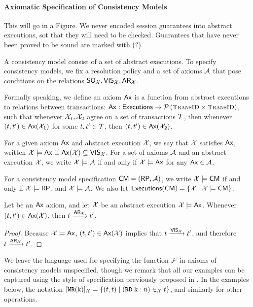 \paragraph{Axiomatic Specification of Consistency Models}
\ac{This will go in a Figure. We never encoded session guarantees into abstract 
executions, sot that they will need to be checked. Guarantees that have never been 
proved to be sound are marked with (?)}

A consistency model consist of a set of abstract executions. 
To specify consistency models, we fix a resolution policy and 
a set of axioms $\mathcal{A}$ that pose conditions on the relations ${\sf{SO}}_{\mathcal{X}}, {\mathsf{VIS}}_{\mathcal{X}}, {\sf{AR}}_{\mathcal{X}}$. 
\begin{definition}
Formally speaking, we define an axiom $\mathsf{Ax}$ is a function from abstract executions to relations between transactions: 
$\Ax: \aeset \rightarrow \powerset{\TxID \times \TxID}$, such that whenever 
$\mathcal{X}_1, \mathcal{X}_2$ agree on a set of transactions $\mathcal{T}$, then whenever $(t, t') \in \mathsf{Ax}(\mathcal{X}_1)$ 
for some $t, t' \in \mathcal{T}$, then $(t, t') \in \mathsf{Ax}(\mathcal{X}_2)$.

For a given axiom $\mathsf{Ax}$ and abstract execution $\mathcal{X}$, 
we say that $\mathcal{X}$ satisfies $\mathsf{Ax}$, written $\mathcal{X} \models \mathsf{Ax}$ if $\mathsf{Ax}(\mathcal{X}) \subseteq {\mathsf{VIS}}_{\mathcal{X}}$. 
For a set of axioms $\mathcal{A}$ and an abstract execution $\mathcal{X}$, we write $\mathcal{X} \models \mathcal{A}$ if 
and only if $\mathcal{X} \models \mathsf{Ax}$ for any $\mathsf{Ax} \in \mathcal{A}$. 
\end{definition}

For a consistency model specification 
$\mathsf{CM} = (\mathsf{RP}, \mathcal{A})$, we write $\mathcal{X} \models \mathsf{CM}$ if and only if $\mathcal{X} \models \mathsf{RP}$, 
and $\mathcal{X} \models \mathcal{A}$. We also let ${\mathsf{Executions}}(\mathsf{CM}) = \{ \mathcal{X} \mid \mathcal{X} \models \mathsf{CM} \}$.

\begin{proposition}
\label{prop:ax2ar}
Let be an $\mathsf{Ax}$ axiom, and let $\mathcal{X}$ be an abstract execution $\mathcal{X} \models \mathsf{Ax}$. 
Whenever $(t, t') \in \mathsf{Ax}(\mathcal{X})$, then $t \xrightarrow{{\sf{AR}}_{\mathcal{X}}} t'$.
\end{proposition}

\begin{proof}
Because $\mathcal{X} \models \mathsf{Ax}$, $(t, t') \in \mathsf{Ax}(\mathcal{X})$ implies that 
$t \xrightarrow{{\mathsf{VIS}}_{\mathcal{X}}} t'$, and therefore $t \xrightarrow{{\sf{AR}}_{\mathcal{X}}} t'$.
\end{proof}

We leave the language used for specifying the function $\mathcal{F}$ in axioms of consistency models unspecified, though 
we remark that all our examples can be captured using the style of specification previously 
proposed in \cite{laws}. In the examples below, the notation  
$[{{\tt WR}}(\mathrm{k})]_{\mathcal{X}} = \{ (t, t) \mid ({{\tt RD}}\; \mathrm{k}: n) \in_{\mathcal{X}} t \}$, and 
similarly for other operations. 

